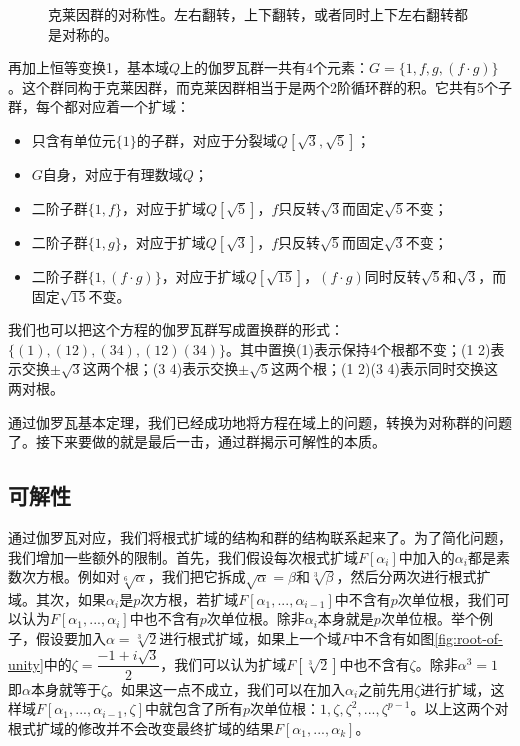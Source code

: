 \documentclass{article}
\begin{document}
\begin{figure}
\centering
{}
\captionsetup{labelformat=empty}
\caption{克莱因群的对称性。左右翻转，上下翻转，或者同时上下左右翻转都是对称的。}
\label{fig:Klein-four-group}
\end{figure}

再加上恒等变换1，基本域$Q$上的伽罗瓦群一共有4个元素：$G = \{1, f, g, (f \cdot g)\}$。这个群同构于克莱因群，而克莱因群相当于是两个2阶循环群的积。它共有5个子群，每个都对应着一个扩域：

\begin{itemize}
\item 只含有单位元$\{1\}$的子群，对应于分裂域$Q[\sqrt{3}, \sqrt{5}]$；
\item $G$自身，对应于有理数域$Q$；
\item 二阶子群$\{1, f\}$，对应于扩域$Q[\sqrt{5}]$，$f$只反转$\sqrt{3}$而固定$\sqrt{5}$不变；
\item 二阶子群$\{1, g\}$，对应于扩域$Q[\sqrt{3}]$，$f$只反转$\sqrt{5}$而固定$\sqrt{3}$不变；
\item 二阶子群$\{1, (f \cdot g)\}$，对应于扩域$Q[\sqrt{15}]$，$(f \cdot g)$同时反转$\sqrt{5}$和$\sqrt{3}$，而固定$\sqrt{15}$不变。
\end{itemize}

我们也可以把这个方程的伽罗瓦群写成置换群的形式：$\{(1), (1 2), (3 4), (1 2)(3 4)\}$。其中置换(1)表示保持4个根都不变；(1 2)表示交换$\pm \sqrt{3}$这两个根；(3 4)表示交换$\pm \sqrt{5}$这两个根；(1 2)(3 4)表示同时交换这两对根。

通过伽罗瓦基本定理，我们已经成功地将方程在域上的问题，转换为对称群的问题了。接下来要做的就是最后一击，通过群揭示可解性的本质。

\subsection{可解性}

通过伽罗瓦对应，我们将根式扩域的结构和群的结构联系起来了。为了简化问题，我们增加一些额外的限制。首先，我们假设每次根式扩域$F[\alpha_i]$中加入的$\alpha_i$都是素数次方根。例如对$\sqrt[6]{\alpha}$，我们把它拆成$\sqrt{\alpha} = \beta$和$\sqrt[3]{\beta}$，然后分两次进行根式扩域。其次，如果$\alpha_i$是$p$次方根，若扩域$F[\alpha_1, ..., \alpha_{i-1}]$中不含有$p$次单位根，我们可以认为$F[\alpha_1, ..., \alpha_i]$中也不含有$p$次单位根。除非$\alpha_i$本身就是$p$次单位根。举个例子，假设要加入$\alpha = \sqrt[3]{2}$进行根式扩域，如果上一个域$F$中不含有如图\ref{fig:root-of-unity}中的$\zeta = \dfrac{-1 + i\sqrt{3}}{2}$，我们可以认为扩域$F[\sqrt[3]{2}]$中也不含有$\zeta$。除非$\alpha^3 = 1$即$\alpha$本身就等于$\zeta$。如果这一点不成立，我们可以在加入$\alpha_i$之前先用$\zeta$进行扩域，这样域$F[\alpha_1, ..., \alpha_{i-1}, \zeta]$中就包含了所有$p$次单位根：$1, \zeta, \zeta^2, ..., \zeta^{p-1}$。以上这两个对根式扩域的修改并不会改变最终扩域的结果$F[\alpha_1, ..., \alpha_k]$。
\end{document}
